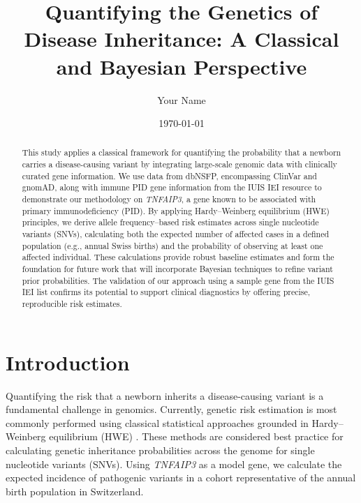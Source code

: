 \documentclass[a4paper,12pt]{article}
\begin{document}
\title{Quantifying the Genetics of Disease Inheritance: A Classical and Bayesian Perspective}
\author{Your Name}
\date{\today}
\maketitle


\begin{abstract}
This study applies a classical framework for quantifying the probability that a newborn carries a disease-causing variant by integrating large-scale genomic data with clinically curated gene information. We use data from dbNSFP, encompassing ClinVar and gnomAD, along with immune PID gene information from the IUIS IEI resource to demonstrate our methodology on \textit{TNFAIP3}, a gene known to be associated with primary immunodeficiency (PID). By applying Hardy–Weinberg equilibrium (HWE) principles, we derive allele frequency–based risk estimates across single nucleotide variants (SNVs), calculating both the expected number of affected cases in a defined population (e.g., annual Swiss births) and the probability of observing at least one affected individual. These calculations provide robust baseline estimates and form the foundation for future work that will incorporate Bayesian techniques to refine variant prior probabilities. The validation of our approach using a sample gene from the IUIS IEI list confirms its potential to support clinical diagnostics by offering precise, reproducible risk estimates.
\end{abstract}

\section{Introduction}
Quantifying the risk that a newborn inherits a disease-causing variant is a fundamental challenge in genomics. Currently, genetic risk estimation is most commonly performed using classical statistical approaches grounded in Hardy–Weinberg equilibrium (HWE)
\cite{MayoCentury2008, AbramovsHardyWeinberg2020}. 
These methods are considered best practice for calculating genetic inheritance probabilities across the genome for single nucleotide variants (SNVs). Using \textit{TNFAIP3} as a model gene, we calculate the expected incidence of pathogenic variants in a cohort representative of the annual birth population in Switzerland.
\end{document}
